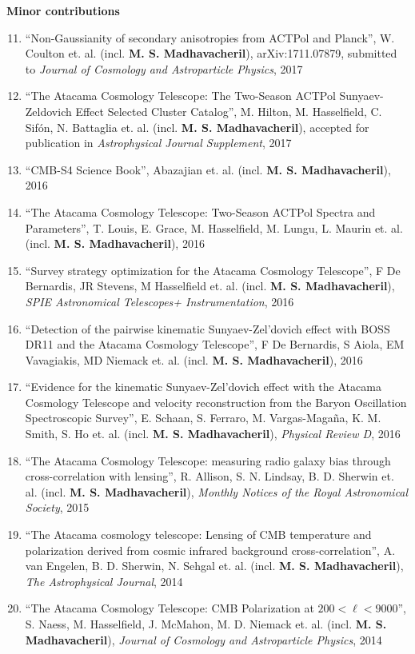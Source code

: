 \documentclass[10pt,margin]{res}
\begin{document}
\begin{resume}
\begin{enumerate}
\end{enumerate}
\textbf{Minor contributions}
\\
\begin{enumerate}
\setcounter{enumi}{10}
\item ``Non-Gaussianity of secondary anisotropies from ACTPol and Planck'', W. Coulton et. al. (incl. {\bf M. S. Madhavacheril}), arXiv:1711.07879, submitted to {\sl Journal of Cosmology and Astroparticle Physics}, 2017
\item ``The Atacama Cosmology Telescope: The Two-Season ACTPol Sunyaev-Zeldovich Effect Selected Cluster Catalog'', M. Hilton, M. Hasselfield, C. Sifón, N. Battaglia et. al. (incl. {\bf M. S. Madhavacheril}), accepted for publication in {\sl Astrophysical Journal Supplement}, 2017
\item ``CMB-S4 Science Book'', Abazajian et. al. (incl. {\bf M. S. Madhavacheril}), 2016
\item ``The Atacama Cosmology Telescope: Two-Season ACTPol Spectra and Parameters'', T. Louis, E. Grace, M. Hasselfield, M. Lungu, L.  Maurin et. al. (incl. {\bf M. S. Madhavacheril}), 2016
\item ``Survey strategy optimization for the Atacama Cosmology Telescope'', F De Bernardis, JR Stevens, M Hasselfield et. al. (incl. {\bf M. S. Madhavacheril}), {\sl SPIE Astronomical Telescopes+ Instrumentation}, 2016
\item ``Detection of the pairwise kinematic Sunyaev-Zel'dovich effect with BOSS DR11 and the Atacama Cosmology Telescope'', F De Bernardis, S Aiola, EM Vavagiakis, MD Niemack et. al. (incl. {\bf M. S. Madhavacheril}), 2016
\item ``Evidence for the kinematic Sunyaev-Zel’dovich effect with the Atacama Cosmology Telescope and velocity reconstruction from the Baryon Oscillation Spectroscopic Survey'', E. Schaan, S. Ferraro, M. Vargas-Magaña, K. M. Smith, S. Ho et. al. (incl. {\bf M. S. Madhavacheril}), {\sl Physical Review D}, 2016
\item ``The Atacama Cosmology Telescope: measuring radio galaxy bias through cross-correlation with lensing'', R. Allison, S. N. Lindsay, B. D. Sherwin et. al. (incl. {\bf M. S. Madhavacheril}), {\sl Monthly Notices of the Royal Astronomical Society}, 2015
\item ``The Atacama cosmology telescope: Lensing of CMB temperature and polarization derived from cosmic infrared background cross-correlation'', A. van Engelen, B. D. Sherwin, N. Sehgal et. al. (incl. {\bf M. S. Madhavacheril}), {\sl The Astrophysical Journal}, 2014
\item ``The Atacama Cosmology Telescope: CMB Polarization at $200< \ell< 9000$'', S. Naess, M. Hasselfield, J. McMahon, M. D. Niemack et. al. (incl. {\bf M. S. Madhavacheril}), {\sl Journal of Cosmology and Astroparticle Physics}, 2014
\end{enumerate}

\end{resume}
\end{document}
